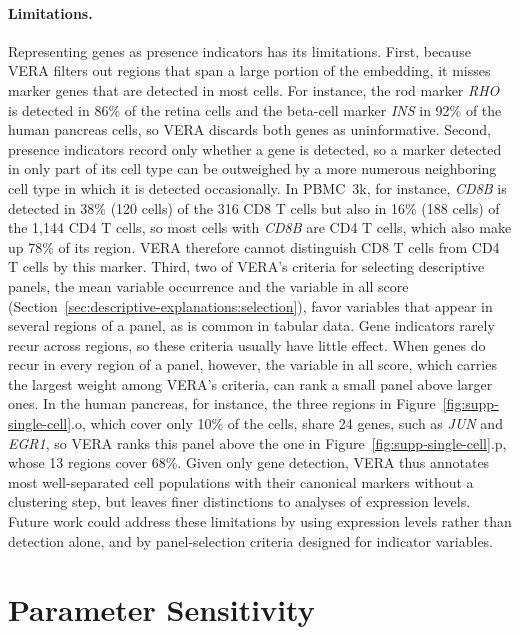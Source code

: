 \documentclass[10pt]{article}
\begin{document}
\paragraph{Limitations.}
Representing genes as presence indicators has its limitations.
First, because VERA filters out regions that span a large portion of the embedding, it misses marker genes that are detected in most cells. For instance, the rod marker \emph{RHO} is detected in 86\% of the retina cells and the beta-cell marker \emph{INS} in 92\% of the human pancreas cells, so VERA discards both genes as uninformative.
Second, presence indicators record only whether a gene is detected, so a marker detected in only part of its cell type can be outweighed by a more numerous neighboring cell type in which it is detected occasionally. In PBMC~3k, for instance, \emph{CD8B} is detected in 38\% (120 cells) of the 316 CD8 T cells but also in 16\% (188 cells) of the 1,144 CD4 T cells, so most cells with \emph{CD8B} are CD4 T cells, which also make up 78\% of its region. VERA therefore cannot distinguish CD8 T cells from CD4 T cells by this marker.
Third, two of VERA's criteria for selecting descriptive panels, the mean variable occurrence and the variable in all score (Section~\ref{sec:descriptive-explanations:selection}), favor variables that appear in several regions of a panel, as is common in tabular data. Gene indicators rarely recur across regions, so these criteria usually have little effect. When genes do recur in every region of a panel, however, the variable in all score, which carries the largest weight among VERA's criteria, can rank a small panel above larger ones. In the human pancreas, for instance, the three regions in Figure~\ref{fig:supp-single-cell}.o, which cover only 10\% of the cells, share 24 genes, such as \emph{JUN} and \emph{EGR1}, so VERA ranks this panel above the one in Figure~\ref{fig:supp-single-cell}.p, whose 13 regions cover 68\%.
Given only gene detection, VERA thus annotates most well-separated cell populations with their canonical markers without a clustering step, but leaves finer distinctions to analyses of expression levels.
Future work could address these limitations by using expression levels rather than detection alone, and by panel-selection criteria designed for indicator variables.

\newpage
\section{Parameter Sensitivity}
\label{sec:supp-parameters}
\end{document}
